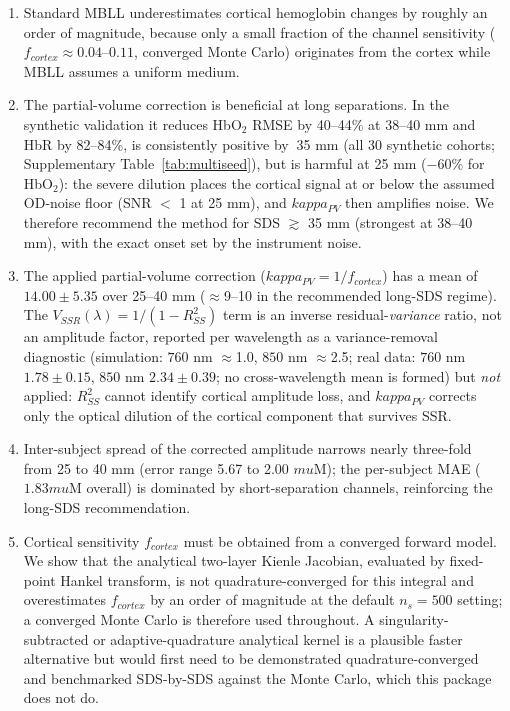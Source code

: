\documentclass[11pt]{article}
\def\kappa{kappa}%
\def\mu{mu}%
\def\sim{~}%
\def\mathrm#1{#1}%
\def\,{ }%
\begin{document}
\begin{enumerate}
\item Standard MBLL underestimates cortical hemoglobin changes by roughly an order of magnitude, because only a small fraction of the channel sensitivity ($f_{\mathrm{cortex}}\approx0.04$--$0.11$, converged Monte Carlo) originates from the cortex while MBLL assumes a uniform medium.
\item The partial-volume correction is beneficial at long separations. In the synthetic validation it reduces HbO$_2$ RMSE by 40--44\% at 38--40\,mm and HbR by 82--84\%, is consistently positive by $\sim$35\,mm (all 30 synthetic cohorts; Supplementary Table~\ref{tab:multiseed}), but is harmful at 25\,mm ($-$60\% for HbO$_2$): the severe dilution places the cortical signal at or below the assumed OD-noise floor (SNR\,$<$\,1 at 25\,mm), and $\kappa_{\mathrm{PV}}$ then amplifies noise. We therefore recommend the method for SDS\,$\gtrsim$\,35\,mm (strongest at 38--40\,mm), with the exact onset set by the instrument noise.
\item The applied partial-volume correction ($\kappa_{\mathrm{PV}} = 1/f_{\mathrm{cortex}}$) has a mean of $14.00 \pm 5.35$ over 25--40\,mm ($\approx$9--10 in the recommended long-SDS regime). The $V_{\mathrm{SSR}}(\lambda) = 1/(1-R^2_{\mathrm{SS}})$ term is an inverse residual-\emph{variance} ratio, not an amplitude factor, reported per wavelength as a variance-removal diagnostic (simulation: $760$\,nm $\approx$1.0, $850$\,nm $\approx$2.5; real data: $760$\,nm $1.78\pm0.15$, $850$\,nm $2.34\pm0.39$; no cross-wavelength mean is formed) but \emph{not} applied: $R^2_{\mathrm{SS}}$ cannot identify cortical amplitude loss, and $\kappa_{\mathrm{PV}}$ corrects only the optical dilution of the cortical component that survives SSR.
\item Inter-subject spread of the corrected amplitude narrows nearly three-fold from 25 to 40\,mm (error range 5.67 to 2.00\,$\mu$M); the per-subject MAE ($1.83\,\mu$M overall) is dominated by short-separation channels, reinforcing the long-SDS recommendation.
\item Cortical sensitivity $f_{\mathrm{cortex}}$ must be obtained from a converged forward model. We show that the analytical two-layer Kienle Jacobian, evaluated by fixed-point Hankel transform, is not quadrature-converged for this integral and overestimates $f_{\mathrm{cortex}}$ by an order of magnitude at the default $n_s = 500$ setting; a converged Monte Carlo is therefore used throughout. A singularity-subtracted or adaptive-quadrature analytical kernel is a plausible faster alternative but would first need to be demonstrated quadrature-converged and benchmarked SDS-by-SDS against the Monte Carlo, which this package does not do.

\end{enumerate}
\end{document}
